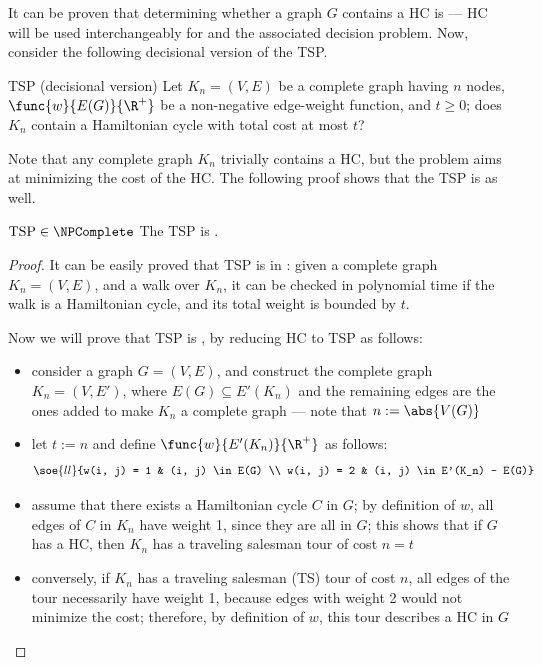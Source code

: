 \documentclass[a4paper, 12pt]{report}
\begin{document}
    It can be proven that determining whether a graph $G$ contains a HC is \NPComplete --- HC will be used interchangeably for  and the associated decision problem. Now, consider the following decisional version of the TSP.

    \begin{frameddefn}{TSP (decisional version)}
        Let $K_n = (V, E)$ be a complete graph having $n$ nodes, $\func{w}{E(G)}{\R^+}$ be a non-negative edge-weight function, and $t \ge 0$; does $K_n$ contain a Hamiltonian cycle with total cost at most $t$?
    \end{frameddefn}

    Note that any complete graph $K_n$ trivially contains a HC, but the problem aims at minimizing the cost of the HC. The following proof shows that the TSP is \NPComplete as well.

    \begin{framedthm}[label={tsp np compl}]{$\mathrm{TSP} \in \NPComplete$}
        The TSP is \NPComplete.
    \end{framedthm}

    \begin{proof}
        It can be easily proved that TSP is in \NPclass: given a complete graph $K_n =(V, E)$, and a walk over $K_n$, it can be checked in polynomial time if the walk is a Hamiltonian cycle, and its total weight is bounded by $t$.

        Now we will prove that TSP is \NPHard, by reducing HC to TSP as follows:

        \begin{itemize}
            \item consider a graph $G = (V, E)$, and construct the complete graph $K_n = (V, E')$, where $E(G) \subseteq E'(K_n)$ and the remaining edges are the ones added to make $K_n$ a complete graph --- note that $n := \abs{V(G)}$
            \item let $t := n$ and define $\func{w}{E'(K_n)}{\R^+}$ as follows: $$\soe{ll}{w(i, j) = 1 & (i, j) \in E(G) \\ w(i, j) = 2 & (i, j) \in E'(K_n) - E(G)}$$
            \item assume that there exists a Hamiltonian cycle $C$ in $G$; by definition of $w$, all edges of $C$ in $K_n$ have weight 1, since they are all in $G$; this shows that if $G$ has a HC, then $K_n$ has a traveling salesman tour of cost $n = t$
            \item conversely, if $K_n$ has a traveling salesman (TS) tour of cost $n$, all edges of the tour necessarily have weight 1, because edges with weight 2 would not minimize the cost; therefore, by definition of $w$, this tour describes a HC in $G$
            \end{itemize}
    \end{proof}
\end{document}
